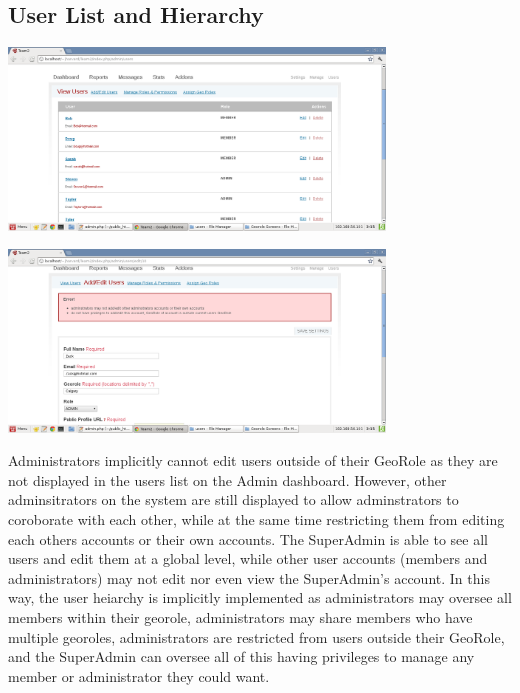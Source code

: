 \documentclass{article}
\begin{document}
\subsection{User List and Hierarchy}
\begin{minipage}{\linewidth}
  \centering
  \includegraphics[width=100mm]{user_list.png}
\end{minipage}
\begin{minipage}{\linewidth}
  \centering
  \includegraphics[width=100mm]{multiple_user_list_error.png}
\end{minipage}
Administrators implicitly cannot edit users outside of their GeoRole as they are not displayed in the users list on the Admin dashboard. However, other adminsitrators on the system are still displayed to allow adminstrators to coroborate with each other, while at the same time restricting them from editing each others accounts or their own accounts. The SuperAdmin is able to see all users and edit them at a global level, while other user accounts (members and administrators) may not edit nor even view the SuperAdmin's account.  In this way, the user heiarchy is implicitly implemented as administrators may oversee all members within their georole, administrators may share members who have multiple georoles, administrators are restricted from users outside their GeoRole, and the SuperAdmin can oversee all of this having privileges to manage any member or administrator they could want.
\end{document}
